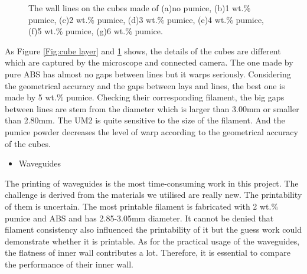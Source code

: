 \begin{figure}[htbp]
{\begin{minipage}[t]{0.2\textwidth}
		\end{minipage}
	}
  \caption[The wall lines on the cubes]{\footnotesize The wall lines on the cubes made of (a)no pumice, (b)1 wt.$\%$ pumice, (c)2 wt.$\%$ pumice, (d)3 wt.$\%$ pumice, (e)4 wt.$\%$ pumice, (f)5 wt.$\%$ pumice, (g)6 wt.$\%$ pumice. }
  \label{Fig:cube layer2}
\end{figure}
As Figure \ref{Fig:cube layer} and \ref{Fig:cube layer2} shows, the details of the cubes are different which are captured by the microscope and connected camera. The one made by pure ABS has almost no gaps between lines but it warps seriously. Considering the geometrical accuracy and the gaps between lays and lines, the best one is made by 5 wt.\% pumice. Checking their corresponding filament, the big gaps between lines are stem from the diameter which is larger than 3.00mm or smaller than 2.80mm. The UM2 is quite sensitive to the size of the filament. And the pumice powder decreases the level of warp according to the geometrical accuracy of the cubes. 

\begin{itemize}
\item Waveguides
\end{itemize}
The printing of waveguides is the most time-consuming work in this project. The challenge is derived from the materials we utilised are really new. The printability of them is uncertain. The most printable filament is fabricated with 2 wt.$\%$ pumice and ABS and has 2.85-3.05mm diameter. It cannot be denied that filament consistency also influenced the printability of it but the guess work could demonstrate whether it is printable. As for the practical usage of the waveguides, the flatness of inner wall contributes a lot. Therefore, it is essential to compare the performance of their inner wall. 

